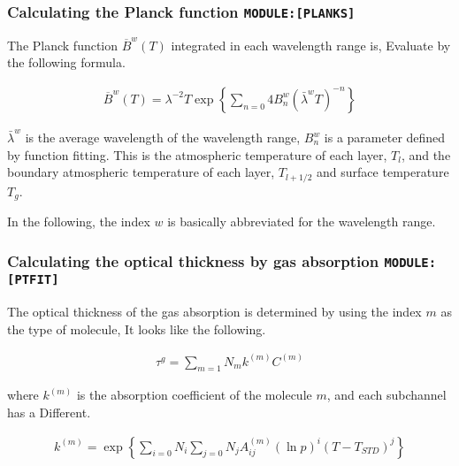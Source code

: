 \hypertarget{calculating-the-planck-function-moduleplanks}{%
\subsubsection{\texorpdfstring{Calculating the Planck function
\texttt{MODULE:{[}PLANKS{]}}}{Calculating the Planck function MODULE:{[}PLANKS{]}}}\label{calculating-the-planck-function-moduleplanks}}

The Planck function \(\overline{B}^w(T)\) integrated in each wavelength
range is, Evaluate by the following formula.

\begin{eqnarray}
  \overline{B}^w(T) 
   = \lambda^{-2} T \exp \left\{ \sum_{n=0}{4} B^w_n (\bar{\lambda}^w T)^{-n}
                         \right\}
\end{eqnarray}

\(\bar{\lambda}^w\) is the average wavelength of the wavelength range,
\(B^w_n\) is a parameter defined by function fitting. This is the
atmospheric temperature of each layer, \(T_l\), and the boundary
atmospheric temperature of each layer, \(T_{l+1/2}\) and surface
temperature \(T_g\).

In the following, the index \(w\) is basically abbreviated for the
wavelength range.

\hypertarget{calculating-the-optical-thickness-by-gas-absorption-moduleptfit}{%
\subsubsection{\texorpdfstring{Calculating the optical thickness by gas
absorption
\texttt{MODULE:{[}PTFIT{]}}}{Calculating the optical thickness by gas absorption MODULE:{[}PTFIT{]}}}\label{calculating-the-optical-thickness-by-gas-absorption-moduleptfit}}

The optical thickness of the gas absorption is determined by using the
index \(m\) as the type of molecule, It looks like the following.

\begin{eqnarray}
  \tau^g = \sum_{m=1}{N_m} k^{(m)} C^{(m)}
\end{eqnarray}

where \(k^{(m)}\) is the absorption coefficient of the molecule \(m\),
and each subchannel has a Different.

\begin{eqnarray}
 k^{(m)} = \exp\left\{ \sum_{i=0}{N_i} \sum_{j=0}{N_j} A^{(m)}_{ij}
                   (\ln p)^{i} (T-T_{STD})^{j}
               \right\}
\end{eqnarray}

